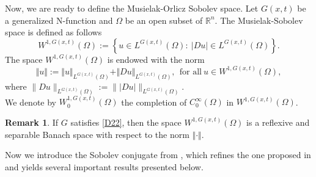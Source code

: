 \documentclass[10pt,reqno]{amsart}
\newcommand *\w{^\wedge}
\theoremstyle{definition}
\newtheorem{theorem}{Theorem}[section]
\newtheorem{remark}[theorem]{Remark}
\numberwithin{equation}{section}
\begin{document}
Now, we are ready to define the  Musielak-Orlicz Sobolev space. Let
$G(x,t)$ be a generalized \textnormal{N}-function and $\Omega$ be an open subset of
$\mathbb{R}^n$. The  Musielak-Sobolev space is defined as follows
$$W^{1,G(x,t)}(\Omega):=\left\lbrace u\in L^{G(x,t)}(\Omega):\ |D u| \in L^{G(x,t)}(\Omega)\right\rbrace.$$
The space $W^{1,G(x,t)}(\Omega)$ is endowed with the norm
\begin{equation}\label{NM}
  \Vert u\Vert:=\Vert u\Vert_{L^{G(x,t)}(\Omega)}+\Vert D u\Vert_{L^{G(x,t)}(\Omega)},\ \ \text{for all}\ u\in W^{1,G(x,t)}(\Omega),
\end{equation}
where $\|D u\|_{L^{G(x,t)}(\Omega)} := \| |D u| \|_{L^{G(x,t)}(\Omega)}$.\\ We denote by
$W^{1,G(x,t)}_0(\Omega)$
 the completion of $C^\infty _0(\Omega)$ in $W^{1,G(x,t)}(\Omega)$.


\begin{remark}\label{Ref}
 If $G$  satisfies \eqref{D22}, then the space
$W^{1,G(x,t)}(\Omega)$ is a reflexive and separable Banach space with
respect to the norm $\Vert \cdot\Vert$.
\end{remark}

Now we introduce the Sobolev conjugate from \cite{Ala3}, which refines the one proposed in \cite{Cianchi2024} and yields several important results presented below.
\end{document}
